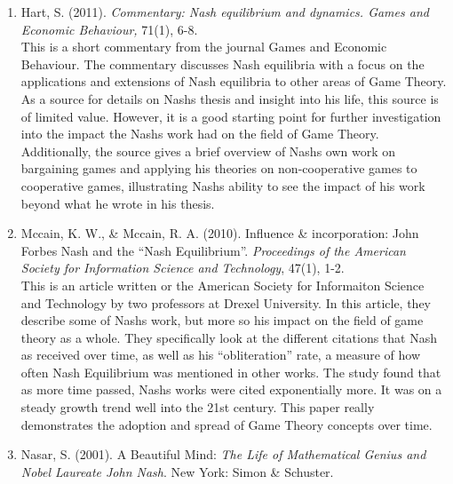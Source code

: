 \documentclass[11pt]{article}
\begin{document}
\begin{enumerate}
\item Hart, S. (2011). \textit{Commentary: Nash equilibrium and dynamics. Games and Economic Behaviour,} 71(1), 6-8.\\

This is a short commentary from the journal Games and Economic Behaviour. The commentary discusses Nash equilibria with a focus on the applications and extensions of Nash equilibria to other areas of Game Theory. As a source for details on Nash\textsc{}s thesis and insight into his life, this source is of limited value. However, it is a good starting point for further investigation into the impact the Nash\textsc{}s work had on the field of Game Theory. Additionally, the source gives a brief overview of Nash\textsc{}s own work on bargaining games and applying his theories on non-cooperative games to cooperative games, illustrating Nash\textsc{}s ability to see the impact of his work beyond what he wrote in his thesis.\\

\item Mccain, K. W., \& Mccain, R. A. (2010). Influence \& incorporation: John Forbes Nash and the “Nash Equilibrium”. \textit{Proceedings of the American Society for Information Science and Technology}, 47(1), 1-2.\\

This is an article written or the American Society for Informaiton Science and Technology by two professors at Drexel University. In this article, they describe some of Nash\textsc{}s work, but more so his impact on the field of game theory as a whole. They specifically look at the different citations that Nash as received over time, as well as his “obliteration” rate, a measure of how often Nash Equilibrium was mentioned in other works. The study found that as more time passed, Nash\textsc{}s works were cited exponentially more. It was on a steady growth trend well into the 21st century. This paper really demonstrates the adoption and spread of Game Theory concepts over time.\\ 

\item Nasar, S. (2001). A Beautiful Mind: \textit{The Life of Mathematical Genius and Nobel Laureate John Nash}. New York: Simon \& Schuster.\\


\end{enumerate}
\end{document}
